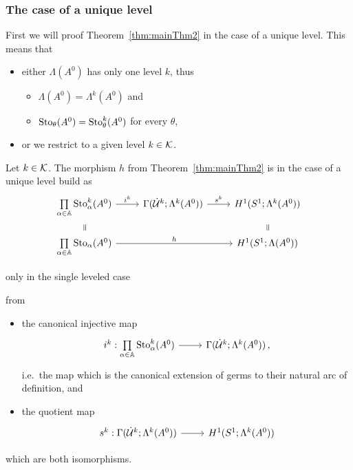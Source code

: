 \subsubsection{The case of a unique level}
First we will proof Theorem~\ref{thm:mainThm2} in the case of a unique level.
This means that
\begin{itemize}
  \item either $\Lambda(A^0)$ has only one level $k$, thus
    \begin{itemize}
      \item $\Lambda(A^0)=\Lambda^k(A^0)$ and
      \item $\operatorname{Sto}_\theta(A^0)=\operatorname{Sto}_\theta^k(A^0)$ for every $\theta$,
    \end{itemize}
  \item or we restrict to a given level $k\in\mathcal{K}$.
\end{itemize}
\begin{lem}
  Let $k\in\mathcal{K}$.
  The morphism $h$ from Theorem~\ref{thm:mainThm2} is in the case of a unique
  level build as
  \[ \begin{tikzcd}[row sep=0cm]
    \underset{\alpha\in\A}\prod\Sto_\alpha^k(A^0)
    \rar{i^k}
    & \Gamma(\dot\cU^k;\Lambda^k(A^0))
    \rar{s^k}
    & H^1(S^1;\Lambda^k(A^0))
    \\
    \text{\rotatebox[origin=c]{-90}{$=$}}
    \tikzmark{e1}
    &&
    \tikzmark{e2}
    \text{\rotatebox[origin=c]{-90}{$=$}}
    \\
    \underset{\alpha\in\A}\prod\Sto_\alpha(A^0)
    \arrow{rr}{h}
    && H^1(S^1;\Lambda(A^0))
  \end{tikzcd} \]
  \begin{flushright}
     only in the single leveled case
  \end{flushright}
  from
  \begin{itemize}
    \item the canonical injective map
      \[ \begin{tikzcd}
        i^k:\underset{\alpha\in\A}\prod\Sto_\alpha^k(A^0) \rar&
        \Gamma(\dot\cU^k;\Lambda^k(A^0)) \,,
      \end{tikzcd} \]
      i.e.\ the map which is the canonical extension of germs to their natural
      arc of definition, and
    \item the quotient map
      \[ \begin{tikzcd}
        s^k:\Gamma(\dot\cU^k;\Lambda^k(A^0)) \rar& H^1(S^1;\Lambda^k(A^0))
      \end{tikzcd} \]
  \end{itemize}
  which are both isomorphisms.
\end{lem}
